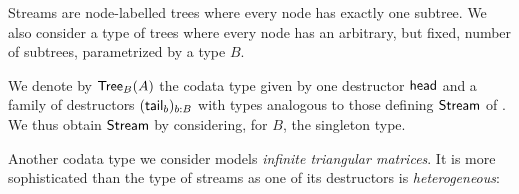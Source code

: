 \documentclass[envcountsame]{llncs}
\begin{document}




\begin{Long}

Streams are node-labelled trees where every node has exactly one subtree.
We also consider a type of trees where every node has an arbitrary, but fixed, number of subtrees, 
parametrized by a type $B$.



\begin{example}\label{ex_trees}
 We denote by $\mathsf{Tree}_B(A)$ the codata type given by one destructor $\mathsf{head}$ and a family of 
 destructors $(\mathsf{tail}_b)_{b:B}$ with types analogous to those defining $\mathsf{Stream}$ of .
 We thus obtain $\mathsf{Stream}$ by considering, for $B$, the singleton type.
\end{example}

\end{Long}

Another codata type we consider models
\emph{infinite triangular matrices}. It is more sophisticated than the type of streams as one of its destructors is \emph{heterogeneous}:
\end{document}
